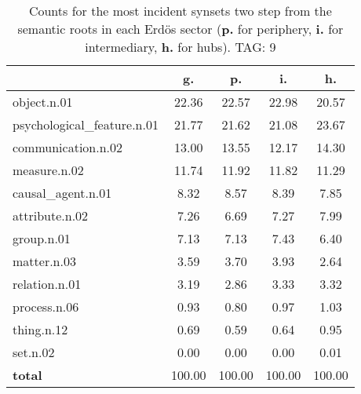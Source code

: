 \begin{table}[h!]
\begin{center}
\begin{tabular}{| l | c | c | c | c |}\hline
 & g. & p. & i. & h. \\\hline
object.n.01 & 22.36  & 22.57  & 22.98  & 20.57 \\\hline
psychological\_feature.n.01 & 21.77  & 21.62  & 21.08  & 23.67 \\\hline
communication.n.02 & 13.00  & 13.55  & 12.17  & 14.30 \\\hline
measure.n.02 & 11.74  & 11.92  & 11.82  & 11.29 \\\hline
causal\_agent.n.01 & 8.32  & 8.57  & 8.39  & 7.85 \\\hline
attribute.n.02 & 7.26  & 6.69  & 7.27  & 7.99 \\\hline
group.n.01 & 7.13  & 7.13  & 7.43  & 6.40 \\\hline
matter.n.03 & 3.59  & 3.70  & 3.93  & 2.64 \\\hline
relation.n.01 & 3.19  & 2.86  & 3.33  & 3.32 \\\hline
process.n.06 & 0.93  & 0.80  & 0.97  & 1.03 \\\hline
thing.n.12 & 0.69  & 0.59  & 0.64  & 0.95 \\\hline
set.n.02 & 0.00  & 0.00  & 0.00  & 0.01 \\\hline
{{\bf total}} & 100.00  & 100.00  & 100.00  & 100.00 \\\hline
\end{tabular}
\caption{Counts for the most incident synsets two step from the semantic roots in each Erd\"os sector ({\bf p.} for periphery, {\bf i.} for intermediary, {\bf h.} for hubs). TAG: 9}
\end{center}
\end{table}